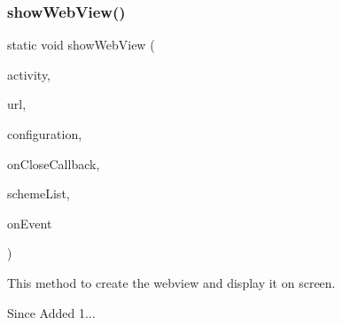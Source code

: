 \subsubsection{\texorpdfstring{show\+Web\+View()}{showWebView()}\hspace{0.1cm}{\footnotesize\ttfamily [3/3]}}
{\footnotesize\ttfamily static void show\+Web\+View (\begin{DoxyParamCaption}\item[{@Non\+Null Activity}]{activity,  }\item[{@Non\+Null String}]{url,  }\item[{@Non\+Null \hyperlink{classcom_1_1toast_1_1android_1_1gamebase_1_1_gamebase_web_view_configuration}{Gamebase\+Web\+View\+Configuration}}]{configuration,  }\item[{\hyperlink{interfacecom_1_1toast_1_1android_1_1gamebase_1_1_gamebase_callback}{Gamebase\+Callback}}]{on\+Close\+Callback,  }\item[{List$<$ String $>$}]{scheme\+List,  }\item[{\hyperlink{interfacecom_1_1toast_1_1android_1_1gamebase_1_1_gamebase_data_callback}{Gamebase\+Data\+Callback}$<$ String $>$}]{on\+Event }\end{DoxyParamCaption})\hspace{0.3cm}{\ttfamily [static]}}



This method to create the webview and display it on screen. 

\begin{DoxySince}{Since}
Added 1... 
\end{DoxySince}

